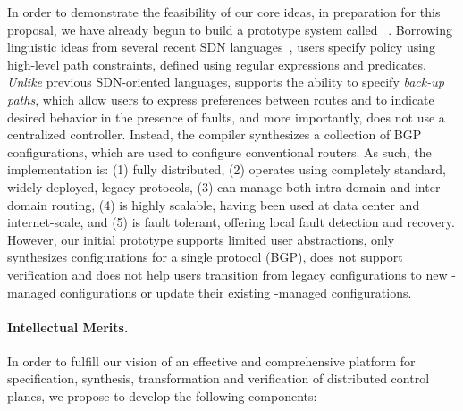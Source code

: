 In order to demonstrate the feasibility of our core ideas, in preparation for this proposal, 
we have already begun to build a prototype system called
\Propane~\cite{beckett+:propane16}. Borrowing linguistic ideas from several recent SDN languages~\cite{fattire,foster:merlin,netkat},
\Propane users specify policy using high-level path constraints, defined using regular expressions and predicates.
\emph{Unlike} previous SDN-oriented languages, \Propane supports the ability to specify \emph{back-up paths}, which allow users 
to express preferences
between routes and to indicate desired behavior in the presence of faults, and more importantly, \Propane{} does not use a 
centralized controller.  Instead, the \Propane{}
compiler synthesizes a collection of BGP configurations, which are used to configure conventional routers.  As such, the 
implementation is:  (1) fully distributed, 
(2) operates using completely standard, widely-deployed, legacy protocols, (3) can manage both intra-domain and inter-domain routing,
(4) is highly scalable, having been used at data center and internet-scale, and (5) is fault tolerant, offering local fault 
detection and recovery.  However, our initial prototype supports limited user abstractions, only synthesizes configurations for a 
single protocol (BGP), does not support verification and does not help users transition from legacy configurations to new \Propane-managed
configurations or update their existing \Propane-managed configurations.

\paragraph*{Intellectual Merits.}
In order to fulfill our
vision of an effective and comprehensive platform for specification, synthesis,
transformation and verification of distributed control planes, we
propose to develop the following components:

